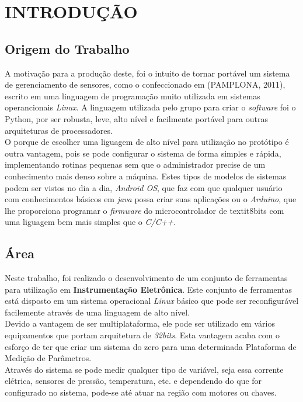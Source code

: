 \documentclass[a4paper, 12pt]{article}
\begin{document}
\section{INTRODUÇÃO}
\vspace{0.5cm}
\subsection{Origem do Trabalho}

\indent\indent A motivação para a produção deste, foi o intuito de tornar portável um sistema de gerenciamento de sensores, como o confeccionado em (PAMPLONA, 2011),
 escrito em uma linguagem de programação muito utilizada em sistemas operancionais \textit{Linux}. A linguagem utilizada pelo grupo para criar o \textit{software} foi o Python,
 por ser robusta, leve, alto nível e facilmente portável para outras arquiteturas de processadores. 
\\
\indent O porque de escolher uma liguagem de alto nível para utilização no protótipo é outra vantagem, pois se pode configurar o sistema de forma simples
 e rápida, implementando rotinas pequenas sem que o administrador precise de um conhecimento mais denso sobre a máquina. Estes tipos de modelos de sistemas 
podem ser vistos no dia a dia, \textit{Android OS}, que faz com que qualquer usuário com conhecimentos básicos em \textit{java} possa criar suas aplicações ou o \textit{Arduino}, que 
lhe proporciona programar o \textit{firmware} do microcontrolador de textit{8bits} com uma liguagem bem mais simples que o \textit{C/C++}.

\subsection{Área}
\indent\indent Neste trabalho, foi realizado o desenvolvimento de um conjunto de ferramentas para utilização em \textbf{Instrumentação Eletrônica}. Este conjunto de 
ferramentas está disposto em um sistema operacional \textit{Linux} básico que pode ser reconfigurável facilemente através de uma linguagem de alto nível.
\\
\indent Devido a vantagem de ser multiplataforma, ele pode ser utilizado em vários equipamentos que portam arquitetura de \textit{32bits}. Esta vantagem acaba com o
 esforço de ter que criar um sistema do zero para uma determinada Plataforma de Medição de Parâmetros.
\\
\indent	Através do sistema se pode medir qualquer tipo de variável, seja essa corrente elétrica, sensores de pressão, temperatura, etc. e dependendo do que 
for configurado no sistema, pode-se até atuar na região com motores ou chaves.
\end{document}

